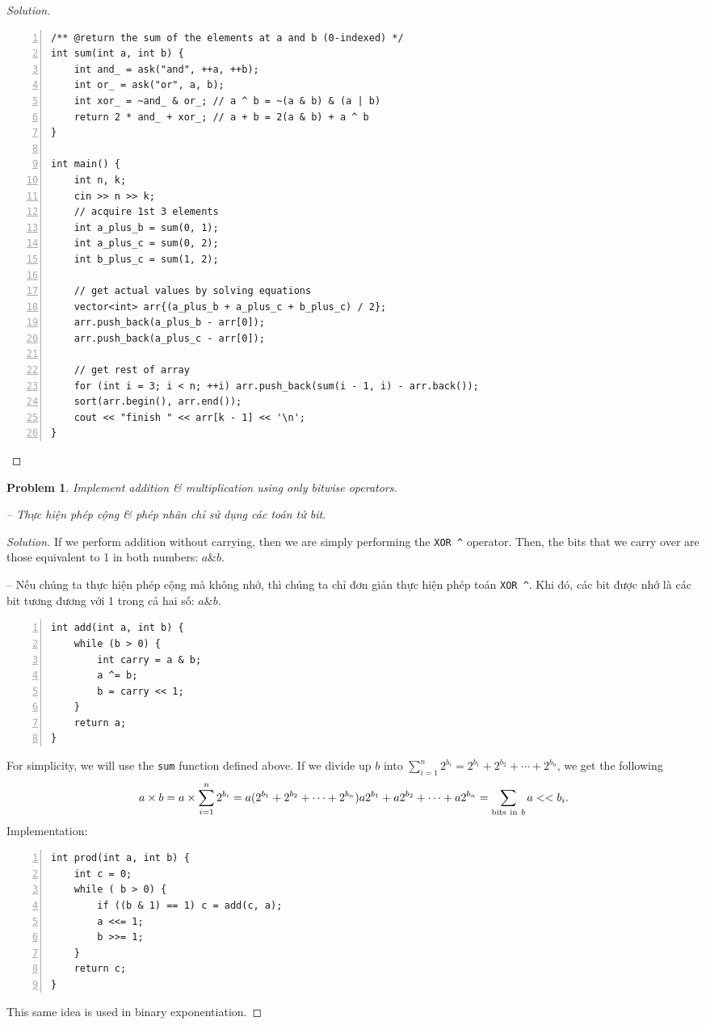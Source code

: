 \documentclass{article}
\newtheorem{problem}{Problem}
\begin{document}
\begin{proof}[Solution]
\begin{Verbatim}[numbers=left,xleftmargin=5mm]
/** @return the sum of the elements at a and b (0-indexed) */
int sum(int a, int b) {
    int and_ = ask("and", ++a, ++b);
    int or_ = ask("or", a, b);
    int xor_ = ~and_ & or_; // a ^ b = ~(a & b) & (a | b)
    return 2 * and_ + xor_; // a + b = 2(a & b) + a ^ b
}

int main() {
    int n, k;
    cin >> n >> k;
    // acquire 1st 3 elements
    int a_plus_b = sum(0, 1);
    int a_plus_c = sum(0, 2);
    int b_plus_c = sum(1, 2);

    // get actual values by solving equations
    vector<int> arr{(a_plus_b + a_plus_c + b_plus_c) / 2};
    arr.push_back(a_plus_b - arr[0]);
    arr.push_back(a_plus_c - arr[0]);

    // get rest of array
    for (int i = 3; i < n; ++i) arr.push_back(sum(i - 1, i) - arr.back());
    sort(arr.begin(), arr.end());
    cout << "finish " << arr[k - 1] << '\n';
}
    \end{Verbatim}
\end{proof}

\begin{problem}
    Implement addition \& multiplication using only bitwise operators.

    -- Thực hiện phép cộng \& phép nhân chỉ sử dụng các toán tử bit.
\end{problem}

\begin{proof}[Solution]
    If we perform addition without carrying, then we are simply performing the \verb|XOR ^| operator. Then, the bits that we carry over are those equivalent to 1 in both numbers: $a\&b$.

    -- Nếu chúng ta thực hiện phép cộng mà không nhớ, thì chúng ta chỉ đơn giản thực hiện phép toán \verb|XOR ^|. Khi đó, các bit được nhớ là các bit tương đương với 1 trong cả hai số: $a\&b$.
    \begin{Verbatim}[numbers=left,xleftmargin=5mm]
int add(int a, int b) {
    while (b > 0) {
        int carry = a & b;
        a ^= b;
        b = carry << 1;
    }
    return a;
}
    \end{Verbatim}
    For simplicity, we will use the {\tt sum} function defined above. If we divide up $b$ into $\sum_{i=1}^n 2^{b_i} = 2^{b_1} + 2^{b_2} + \cdots + 2^{b_n}$, we get the following
    \begin{equation*}
        a\times b = a\times\sum_{i=1}^n 2^{b_i} = a(2^{b_1} + 2^{b_2} + \cdots + 2^{b_n}) a2^{b_1} + a2^{b_2} + \cdots + a2^{b_n} = \sum_{{\rm bits\ in\ }b} a << b_i.
    \end{equation*}
    Implementation:
    \begin{Verbatim}[numbers=left,xleftmargin=5mm]
int prod(int a, int b) {
    int c = 0;
    while ( b > 0) {
        if ((b & 1) == 1) c = add(c, a);
        a <<= 1;
        b >>= 1;
    }
    return c;
}
    \end{Verbatim}
    This same idea is used in binary exponentiation.
\end{proof}
\end{document}
